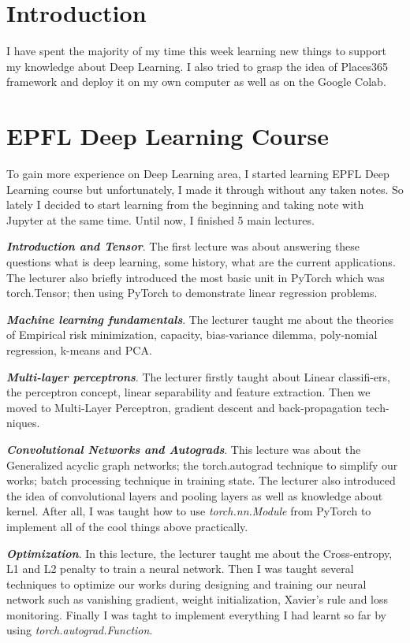 \section{Introduction}
I have spent the majority of my time this week learning new things to support my knowledge about Deep Learning. I also tried to grasp the idea of Places365 framework and deploy it on my own computer as well as on the Google Colab.

\section{EPFL Deep Learning Course}
To gain more experience on Deep Learning area, I started learning EPFL Deep Learning course\cite{epfl} but unfortunately, I made it through without any taken notes. So lately I decided to start learning from the beginning and taking note with Jupyter at the same time. Until now, I finished 5 main lectures.
	
\textbf{\emph{Introduction and Tensor}}. The first lecture was about answering these questions what is deep learning, some history, what are the current applications. The lecturer also briefly introduced the most basic unit in PyTorch which was torch.Tensor; then using PyTorch to demonstrate linear regression problems.

\textbf{\emph{Machine learning fundamentals}}. The lecturer taught me about the theories of Empirical risk minimization, capacity, bias-variance dilemma, poly-nomial regression, k-means and PCA.

\textbf{\emph{Multi-layer perceptrons}}. The lecturer firstly taught about Linear classifi-ers, the perceptron concept, linear separability and feature extraction. Then we moved to Multi-Layer Perceptron, gradient descent and back-propagation tech-niques.

\textbf{\emph{Convolutional Networks and Autograds}}. This lecture was about the Generalized acyclic graph networks; the torch.autograd technique to simplify our works; batch processing technique in training state. The lecturer also introduced the idea of convolutional layers and pooling layers as well as knowledge about kernel. After all, I was taught how to use \emph{torch.nn.Module} from PyTorch to implement all of the cool things above practically.

	
\textbf{\emph{Optimization}}. In this lecture, the lecturer taught me about the Cross-entropy, L1 and L2 penalty to train a neural network. Then I was taught several techniques to optimize our works during designing and training our neural network such as vanishing gradient, weight initialization, Xavier's rule and loss monitoring. Finally I was taght to implement everything I had learnt so far by using \emph{torch.autograd.Function}.

